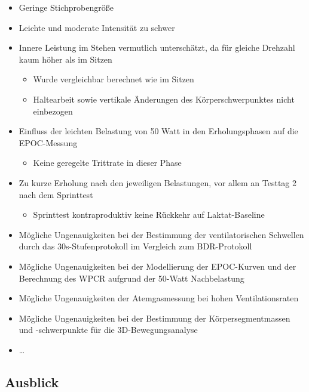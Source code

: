 \documentclass[
  letterpaper,
  DIV=11]{scrartcl}
\providecommand{\tightlist}{%
  \setlength{\itemsep}{0pt}\setlength{\parskip}{0pt}}\usepackage{longtable,booktabs,array}
\begin{document}
\begin{itemize}
\tightlist
\item
  Geringe Stichprobengröße
\item
  Leichte und moderate Intensität zu schwer
\item
  Innere Leistung im Stehen vermutlich unterschätzt, da für gleiche
  Drehzahl kaum höher als im Sitzen

  \begin{itemize}
  \tightlist
  \item
    Wurde vergleichbar berechnet wie im Sitzen
  \item
    Haltearbeit sowie vertikale Änderungen des Körperschwerpunktes nicht
    einbezogen
  \end{itemize}
\item
  Einfluss der leichten Belastung von 50 Watt in den Erholungsphasen auf
  die EPOC-Messung

  \begin{itemize}
  \tightlist
  \item
    Keine geregelte Trittrate in dieser Phase
  \end{itemize}
\item
  Zu kurze Erholung nach den jeweiligen Belastungen, vor allem an
  Testtag 2 nach dem Sprinttest

  \begin{itemize}
  \tightlist
  \item
    Sprinttest kontraproduktiv keine Rückkehr auf Laktat-Baseline
  \end{itemize}
\item
  Mögliche Ungenauigkeiten bei der Bestimmung der ventilatorischen
  Schwellen durch das 30s-Stufenprotokoll im Vergleich zum BDR-Protokoll
\item
  Mögliche Ungenauigkeiten bei der Modellierung der EPOC-Kurven und der
  Berechnung des WPCR aufgrund der 50-Watt Nachbelastung
\item
  Mögliche Ungenauigkeiten der Atemgasmessung bei hohen
  Ventilationsraten
\item
  Mögliche Ungenauigkeiten bei der Bestimmung der Körpersegmentmassen
  und -schwerpunkte für die 3D-Bewegungsanalyse
\item
  \ldots{}
\end{itemize}

\subsection{Ausblick}\label{ausblick}
\end{document}
